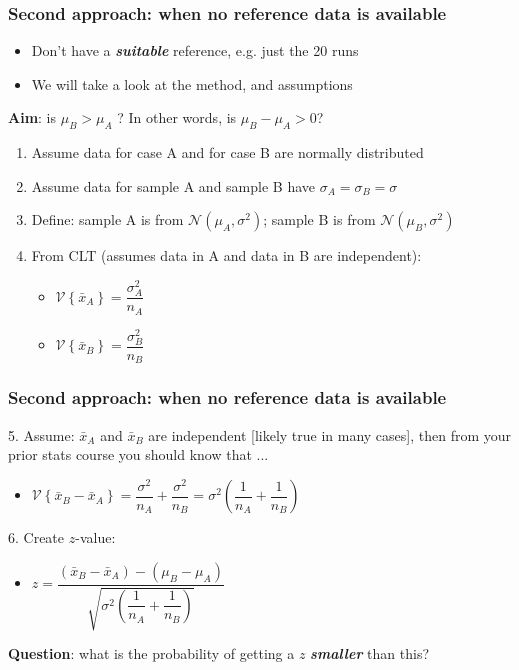 \begin{frame}\frametitle{Second approach: when no reference data is available}
	\begin{itemize}
		\item	Don't have a \textbf{\emph{suitable}} reference, e.g. just the 20 runs
		\item	We will take a look at the method, and assumptions
	\end{itemize}

	\textbf{Aim}: is $\mu_B > \mu_A$ ? In other words, is $\mu_B - \mu_A > 0$?
	\begin{enumerate}
		\item	Assume data for case A and for case B are normally distributed
		\item	Assume data for sample A and sample B have $\sigma_A = \sigma_B = \sigma$
		\item	Define: sample A is from $\mathcal{N}\left(\mu_A, \sigma^2\right)$; sample B is from $\mathcal{N}\left(\mu_B, \sigma^2\right)$
		\item	From CLT (assumes data in A and data in B are independent):  {\color{myOrange}{\small $\longleftarrow$ but, but ... we know that's not true here!}}
			\begin{itemize}
				\item	$\mathcal{V}\left\{\bar{x}_A\right\} = \dfrac{\sigma^2_A}{n_A}$
				\item	$\mathcal{V}\left\{\bar{x}_B\right\} = \dfrac{\sigma^2_B}{n_B}$
			\end{itemize}
	\end{enumerate}
\end{frame}

\begin{frame}\frametitle{Second approach: when no reference data is available}

	5. Assume: $\bar{x}_A$ and $\bar{x}_B$ are independent [likely true in many cases], then from your prior stats course you should know that ...
	\begin{itemize}
		\item	$\mathcal{V}\left\{\bar{x}_B - \bar{x}_A\right\} = \dfrac{\sigma^2}{n_A} + \dfrac{\sigma^2}{n_B} = \sigma^2 \left(\dfrac{1}{n_A} + \dfrac{1}{n_B}\right)$
	\end{itemize}

	6. Create $z$-value:
	\begin{itemize}
		\item	$z = \dfrac{(\bar{x}_B - \bar{x}_A) - (\mu_B - \mu_A)}{\sqrt{\sigma^2 \left(\dfrac{1}{n_A} + \dfrac{1}{n_B}\right)}}$
	\end{itemize}

	\textbf{Question}: what is the probability of getting a $z$ \textbf{\emph{smaller}} than this?
\end{frame}

